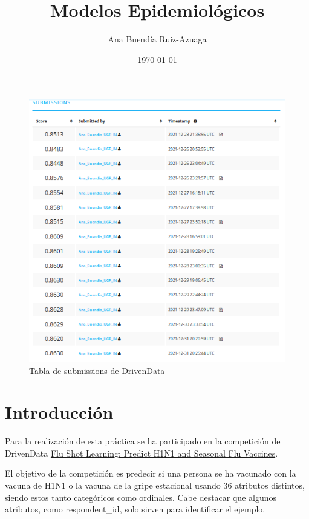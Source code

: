 \documentclass[twoside,openright,titlepage,numbers=noenddot,openany,headinclude,footinclude=true,
cleardoublepage=empty,abstractoff,BCOR=5mm,paper=a4,fontsize=12pt,main=spanish]{scrreprt}
\author{Ana Buendía Ruiz-Azuaga}
\date{\today}
\title{Modelos Epidemiológicos}
\begin{document}
\maketitle


{}

\begin{figure}
\includegraphics[scale=1]{submissions.png}
\caption{Tabla de submissions de DrivenData}
\end{figure}

\newpage
\tableofcontents
\newpage

\section{Introducción}

Para la realización de esta práctica se ha participado en la competición de DrivenData \href{https://www.drivendata.org/competitions/66/flu-shot-learning/}{Flu Shot Learning: Predict H1N1 and Seasonal Flu Vaccines}.

El objetivo de la competición es predecir si una persona se ha vacunado con la vacuna de H1N1 o la vacuna de la gripe estacional usando 36 atributos distintos, siendo estos tanto categóricos como ordinales. Cabe destacar que algunos atributos, como respondent\_id, solo sirven para identificar el ejemplo.
\end{document}
